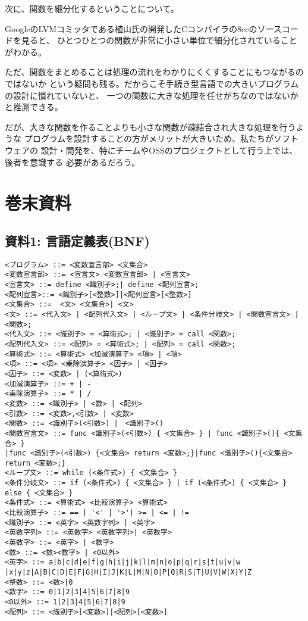 \documentclass[11pt,a4j]{jarticle}
\begin{document}
\vspace{0.2in}

次に、関数を細分化するということについて。

GoogleのLVMコミッタである植山氏の開発したCコンパイラの8ccのソースコードを見ると、
ひとつひとつの関数が非常に小さい単位で細分化されていることがわかる。

ただ、関数をまとめることは処理の流れをわかりにくくすることにもつながるのではないか
という疑問も残る。だからこそ手続き型言語での大きいプログラムの設計に慣れていないと、
一つの関数に大きな処理を任せがちなのではないかと推測できる。

だが、大きな関数を作ることよりも小さな関数が疎結合され大きな処理を行うような
プログラムを設計することの方がメリットが大きいため、私たちがソフトウェアの
設計・開発を、特にチームやOSSのプロジェクトとして行う上では、後者を意識する
必要があるだろう。




\section{巻末資料}

\subsection{資料1: 言語定義表(BNF)}

{\baselineskip 2mm
\begin{verbatim}
<プログラム> ::= <変数宣言部> <文集合>
<変数宣言部> ::= <宣言文> <変数宣言部> | <宣言文>
<宣言文> ::= define <識別子>;| define <配列宣言>;
<配列宣言>::= <識別子>[<整数>]|<配列宣言>[<整数>]
<文集合> ::=  <文> <文集合>| <文>
<文> ::= <代入文> | <配列代入文> | <ループ文> | <条件分岐文> | <関数宣言文> | <関数>;
<代入文> ::= <識別子> = <算術式>; | <識別子> = call <関数>; 
<配列代入文> ::= <配列> = <算術式>; | <配列> = call <関数>;
<算術式> ::= <算術式> <加減演算子> <項> | <項>
<項> ::= <項> <乗除演算子> <因子> | <因子>
<因子> ::= <変数> | (<算術式>)
<加減演算子> ::= + | -
<乗除演算子> ::= * | /
<変数> ::= <識別子> | <数> | <配列>
<引数> ::= <変数>,<引数> | <変数>
<関数> ::= <識別子>(<引数>) |　<識別子>()
<関数宣言文> ::= func <識別子>(<引数>) { <文集合> } | func <識別子>(){ <文集合> }
|func <識別子>(<引数>) {<文集合> return <変数>;}|func <識別子>(){<文集合> return <変数>;}
<ループ文> ::= while (<条件式>) { <文集合> }
<条件分岐文> ::= if (<条件式>) { <文集合> } | if (<条件式>) { <文集合> } else { <文集合> }
<条件式> ::= <算術式> <比較演算子> <算術式>
<比較演算子> ::= == | '<' | '>'| >= | <= | !=
<識別子> ::= <英字> <英数字列> | <英字>
<英数字列> ::= <英数字> <英数字列>| <英数字>
<英数字> ::= <英字> | <数字>
<数> ::= <数><数字> | <0以外>
<英字> ::= a|b|c|d|e|f|g|h|i|j|k|l|m|n|o|p|q|r|s|t|u|v|w
|x|y|z|A|B|C|D|E|F|G|H|I|J|K|L|M|N|O|P|Q|R|S|T|U|V|W|X|Y|Z
<整数> ::= <数>|0
<数字> ::= 0|1|2|3|4|5|6|7|8|9
<0以外> ::= 1|2|3|4|5|6|7|8|9
<配列> ::= <識別子>[<変数>]|<配列>[<変数>]
\end{verbatim}}
\end{document}
